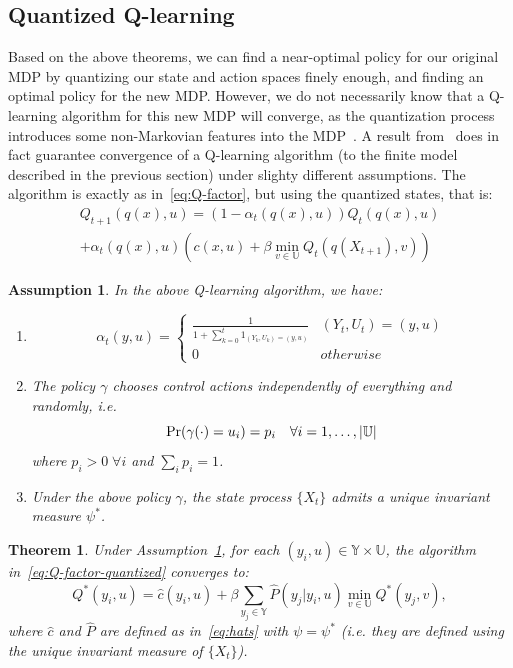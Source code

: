 \documentclass[conference]{IEEEtran}
\newtheorem{theorem}{Theorem}[section]
\newtheorem{assumption}{Assumption}[section]
\begin{document}
\subsection{Quantized Q-learning}
Based on the above theorems, we can find a near-optimal policy for our original MDP by quantizing our state and action spaces finely enough, and finding an optimal policy for the new MDP. However, we do not necessarily know that a Q-learning algorithm for this new MDP will converge, as the quantization process introduces some non-Markovian features into the MDP~\cite{Kara}. A result from~\cite{Kara} does in fact guarantee convergence of a Q-learning algorithm (to the finite model described in the previous section) under slighty different assumptions. The algorithm is exactly as in~\eqref{eq:Q-factor}, but using the quantized states, that is:
\begin{multline}
    Q_{t+1}(q(x),u) = (1- \alpha_t(q(x),u))Q_t(q(x),u) \\ +
    \alpha_t(q(x),u)(c(x,u)+\beta \; \underset{v\in\mathbb{U}}{\text{min}} \; Q_t(q(X_{t+1}),v))\label{eq:Q-factor-quantized}
\end{multline}

\begin{assumption}\label{assumption:Q-learning} In the above Q-learning algorithm, we have:
    \begin{enumerate}
        \item \[\alpha_t(y,u) = \begin{cases}
                      \frac{1}{1 + \sum_{k=0}^t 1_{(Y_k,U_k) = (y,u)}} & (Y_t,U_t) = (y,u) \\
                      0                                                & otherwise
                  \end{cases}\]
        \item The policy \(\gamma\) chooses control actions independently of everything and randomly, i.e.
              \[ \textup{Pr}(\gamma(\cdot) = u_i) = p_i \quad \forall i = 1,\ldots,|\mathbb{U}| \]
              where \(p_i > 0 \; \forall i\) and \(\sum_i p_i = 1\).
        \item Under the above policy \(\gamma\), the state process \(\{X_t\}\) admits a unique invariant measure \(\psi^*\).
    \end{enumerate}
\end{assumption}

\begin{theorem}\label{theorem:convergence}\cite[Theorem 3.2]{Kara}
    Under Assumption~\ref{assumption:Q-learning}, for each \((y_i,u) \in \mathbb{Y} \times \mathbb{U}\), the algorithm in~\eqref{eq:Q-factor-quantized} converges to:
    \[ Q^*(y_i,u) = \hat{c}(y_i,u) + \beta \sum_{y_j \in \mathbb{Y}}\hat{P}(y_j | y_i,u)\min_{v \in \mathbb{U}}Q^*(y_j,v), \]
    where \(\hat{c}\) and \(\hat{P}\) are defined as in~\eqref{eq:hats} with \(\psi = \psi^*\) (i.e. they are defined using the unique invariant measure of \(\{X_t\}\)).
\end{theorem}
\end{document}
